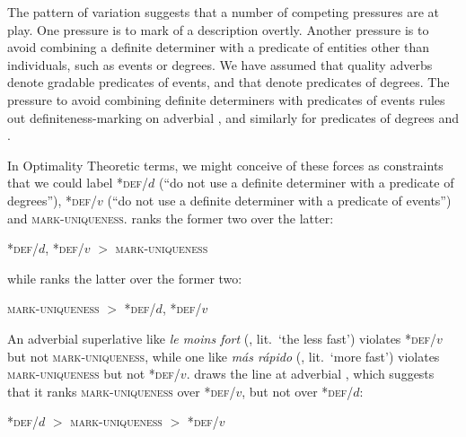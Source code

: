 \documentclass[output=paper
,modfonts
,nonflat]{langsci/langscibook}
\begin{document}
The pattern of variation suggests that a number of competing pressures are at play. One pressure is to mark  of a description overtly. Another pressure is to avoid combining a definite determiner with a predicate of entities other than individuals, such as events or degrees. We have assumed that quality adverbs denote gradable predicates of events, and that  denote predicates of degrees. The pressure to avoid combining definite determiners with predicates of events rules out definiteness-marking on adverbial , and similarly for predicates of degrees and .

In Optimality Theoretic terms, we might conceive of these forces as constraints that we could label *\textsc{def}/$d$ (``do not use a definite determiner with a predicate of degrees''), *\textsc{def}/$v$ (``do not use a definite determiner with a predicate of events'') and \textsc{mark-uniqueness}.   ranks the former two over the latter:
\begin{center}
*\textsc{def}/$d$,  *\textsc{def}/$v$  $>$ \textsc{mark-uniqueness}
\end{center}
while  ranks the latter over the former two:
\begin{center}
\textsc{mark-uniqueness} $>$ *\textsc{def}/$d$,  *\textsc{def}/$v$ 
\end{center}
An adverbial superlative like \textit{le moins fort} (, lit.\ `the less fast') violates *\textsc{def}/$v$ but not \textsc{mark-uniqueness}, while one like \textit{m\'as r\'apido} (, lit.\ `more fast') violates \textsc{mark-uniqueness} but not *\textsc{def}/$v$.  draws the line at adverbial , which suggests that it ranks \textsc{mark-uniqueness} over *\textsc{def}/$v$, but not over *\textsc{def}/$d$:
\begin{center}
*\textsc{def}/$d$ $>$ \textsc{mark-uniqueness} $>$  *\textsc{def}/$v$
\end{center}
\end{document}
